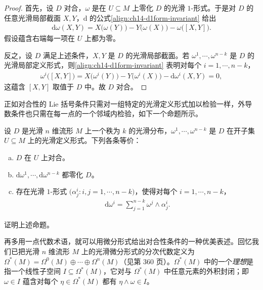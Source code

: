 \documentclass[../../main.tex]{subfiles}
\begin{document}
\begin{proof}
首先，设 $D$ 对合，$\omega$ 是在 $U\subseteq M$ 上零化 $D$ 的光滑 $1$-形式。于是对 $D$ 的任意光滑局部截面 $X,Y$，$\mathrm{d}$ 的公式\eqref{align:ch14-d1form-invariant} 给出
\begin{align*}
\mathrm{d}\omega(X,Y)=X\bigl(\omega(Y)\bigr)-Y\bigl(\omega(X)\bigr)-\omega\bigl([X,Y]\bigr).
\end{align*}
假设蕴含右端每一项在 $U$ 上都为零。

反之，设 $D$ 满足上述条件，$X,Y$ 是 $D$ 的光滑局部截面。若 $\omega^1,\cdots ,\omega^{n-k}$ 是 $D$ 的光滑局部定义形式，则\eqref{align:ch14-d1form-invariant} 表明对每个 $i=1,\cdots ,n-k$，
\begin{align*}
\omega^i\bigl([X,Y]\bigr)=X\bigl(\omega^i(Y)\bigr)-Y\bigl(\omega^i(X)\bigr)-\mathrm{d}\omega^i(X,Y)=0,
\end{align*}
这蕴含 $[X,Y]$ 取值于 $D$ 中。故 $D$ 对合。
\end{proof}

正如对合性的 Lie 括号条件只需对一组特定的光滑定义形式加以检验一样，外导数条件也只需在每一点的一个邻域内检验，如下一个命题所示。

\begin{proposition}[对合性的局部余标架判别法]\label{proposition:ch19-局部余标架对合判别}
设 $D$ 是光滑 $n$ 维流形 $M$ 上一个秩为 $k$ 的光滑分布，$\omega^1,\cdots ,\omega^{n-k}$ 是 $D$ 在开子集 $U\subseteq M$ 上的光滑定义形式。下列各条等价：
\begin{enumerate}[(a)]
\item $D$ 在 $U$ 上对合。
\item $\mathrm{d}\omega^1,\cdots ,\mathrm{d}\omega^{n-k}$ 都零化 $D$。
\item 存在光滑 $1$-形式 $\bigl(\alpha^i_j\colon i,j=1,\cdots ,n-k\bigr)$，使得对每个 $i=1,\cdots ,n-k$，
\begin{align*}
\mathrm{d}\omega^i=\sum_{j=1}^{n-k}\omega^j\wedge\alpha^i_j.
\end{align*}
\end{enumerate}
\end{proposition}

\begin{exercise}\label{exercise:ch19-09}
证明上述命题。
\end{exercise}

再多用一点代数术语，就可以用微分形式给出对合性条件的一种优美表述。回忆我们已把光滑 $n$ 维流形 $M$ 上的光滑微分形式的分次代数定义为 $\Omega^*(M)=\Omega^0(M)\oplus\cdots\oplus\Omega^n(M)$（见第 360 页）。$\Omega^*(M)$ 中的一个\emph{理想}是指一个线性子空间 $I\subseteq\Omega^*(M)$，它对与 $\Omega^*(M)$ 中任意元素的外积封闭；即 $\omega\in I$ 蕴含对每个 $\eta\in\Omega^*(M)$ 都有 $\eta\wedge\omega\in I$。
\end{document}
